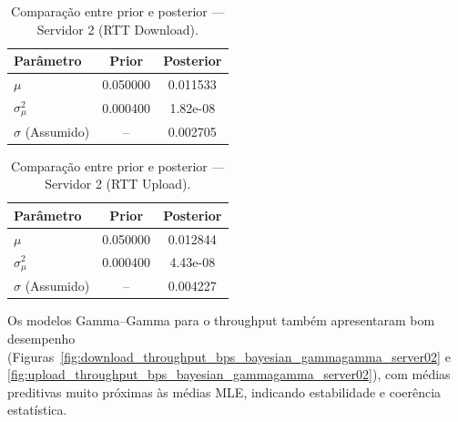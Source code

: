 \documentclass{article}
\begin{document}
\begin{table}[htp]
	\centering
	\caption{Comparação entre prior e posterior — Servidor 2 (RTT Download).}
	\label{tab:bayes_rtt_download_server02}
	\begin{tabular}{lcc}
		\hline
		\textbf{Parâmetro} & \textbf{Prior} & \textbf{Posterior} \\ \hline
		$\mu$ & 0.050000 & 0.011533 \\
		$\sigma^2_{\mu}$ & 0.000400 & 1.82e-08 \\
		$\sigma$ (Assumido) & -- & 0.002705 \\ \hline
	\end{tabular}
\end{table}

\begin{table}[htp]
	\centering
	\caption{Comparação entre prior e posterior — Servidor 2 (RTT Upload).}
	\label{tab:bayes_rtt_upload_server02}
	\begin{tabular}{lcc}
		\hline
		\textbf{Parâmetro} & \textbf{Prior} & \textbf{Posterior} \\ \hline
		$\mu$ & 0.050000 & 0.012844 \\
		$\sigma^2_{\mu}$ & 0.000400 & 4.43e-08 \\
		$\sigma$ (Assumido) & -- & 0.004227 \\ \hline
	\end{tabular}
\end{table}

Os modelos Gamma–Gamma para o throughput também apresentaram bom desempenho
(Figuras~\ref{fig:download_throughput_bps_bayesian_gammagamma_server02} e
\ref{fig:upload_throughput_bps_bayesian_gammagamma_server02}), com médias preditivas
muito próximas às médias MLE, indicando estabilidade e coerência estatística.
\end{document}
